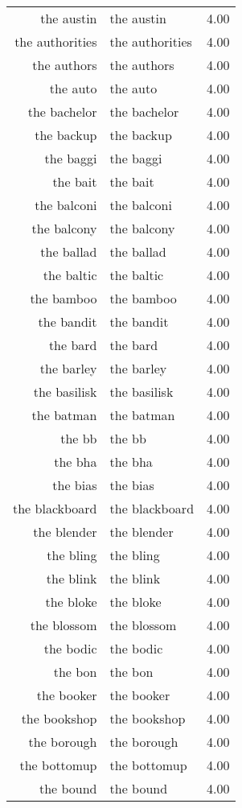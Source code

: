 \begin{table}[ht]
\begin{tabular}{rlr}
  the austin & the austin & 4.00 \\ 
  the authorities & the authorities & 4.00 \\ 
  the authors & the authors & 4.00 \\ 
  the auto & the auto & 4.00 \\ 
  the bachelor & the bachelor & 4.00 \\ 
  the backup & the backup & 4.00 \\ 
  the baggi & the baggi & 4.00 \\ 
  the bait & the bait & 4.00 \\ 
  the balconi & the balconi & 4.00 \\ 
  the balcony & the balcony & 4.00 \\ 
  the ballad & the ballad & 4.00 \\ 
  the baltic & the baltic & 4.00 \\ 
  the bamboo & the bamboo & 4.00 \\ 
  the bandit & the bandit & 4.00 \\ 
  the bard & the bard & 4.00 \\ 
  the barley & the barley & 4.00 \\ 
  the basilisk & the basilisk & 4.00 \\ 
  the batman & the batman & 4.00 \\ 
  the bb & the bb & 4.00 \\ 
  the bha & the bha & 4.00 \\ 
  the bias & the bias & 4.00 \\ 
  the blackboard & the blackboard & 4.00 \\ 
  the blender & the blender & 4.00 \\ 
  the bling & the bling & 4.00 \\ 
  the blink & the blink & 4.00 \\ 
  the bloke & the bloke & 4.00 \\ 
  the blossom & the blossom & 4.00 \\ 
  the bodic & the bodic & 4.00 \\ 
  the bon & the bon & 4.00 \\ 
  the booker & the booker & 4.00 \\ 
  the bookshop & the bookshop & 4.00 \\ 
  the borough & the borough & 4.00 \\ 
  the bottomup & the bottomup & 4.00 \\ 
  the bound & the bound & 4.00 \\ 

\end{tabular}
\end{table}
